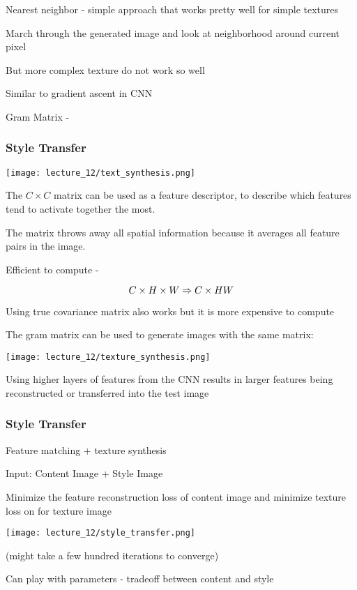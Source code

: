 Nearest neighbor - simple approach that works pretty well for simple textures

March through the generated image and look at neighborhood around current pixel

But more complex texture do not work so well

Similar to gradient ascent in CNN

Gram Matrix -  

\subsubsection{Style Transfer}

\texttt{[image: lecture\_12/text\_synthesis.png]}

The $C\times C$ matrix can be used as a feature descriptor, to describe which features tend to activate together the most.

The matrix throws away all spatial information because it averages all feature pairs in the image. 

Efficient to compute - 

$$ C \times H \times W \Rightarrow C \times HW \\$$ 

Using true covariance matrix also works but it is more expensive to compute

The gram matrix can be used to generate images with the same matrix:

\texttt{[image: lecture\_12/texture\_synthesis.png]}

Using higher layers of features from the CNN results in larger features being reconstructed or transferred into the test image

\subsubsection{Style Transfer}

Feature matching + texture synthesis

Input: Content Image + Style Image

Minimize the feature reconstruction loss of content image and minimize texture loss on for texture image

\texttt{[image: lecture\_12/style\_transfer.png]}

(might take a few hundred iterations to converge)

Can play with parameters - tradeoff between content and style

